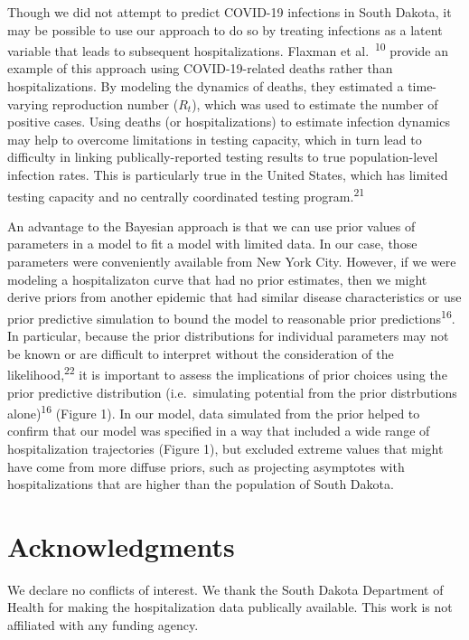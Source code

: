\documentclass[
]{article}
\begin{document}
Though we did not attempt to predict COVID-19 infections in South Dakota, it may be possible to use our approach to do so by treating infections as a latent variable that leads to subsequent hospitalizations. Flaxman et al.~\textsuperscript{10} provide an example of this approach using COVID-19-related deaths rather than hospitalizations. By modeling the dynamics of deaths, they estimated a time-varying reproduction number (\(R_t\)), which was used to estimate the number of positive cases. Using deaths (or hospitalizations) to estimate infection dynamics may help to overcome limitations in testing capacity, which in turn lead to difficulty in linking publically-reported testing results to true population-level infection rates. This is particularly true in the United States, which has limited testing capacity and no centrally coordinated testing program.\textsuperscript{21}

An advantage to the Bayesian approach is that we can use prior values of parameters in a model to fit a model with limited data. In our case, those parameters were conveniently available from New York City. However, if we were modeling a hospitalizaton curve that had no prior estimates, then we might derive priors from another epidemic that had similar disease characteristics or use prior predictive simulation to bound the model to reasonable prior predictions\textsuperscript{16}. In particular, because the prior distributions for individual parameters may not be known or are difficult to interpret without the consideration of the likelihood,\textsuperscript{22} it is important to assess the implications of prior choices using the prior predictive distribution (i.e.~simulating potential from the prior distrbutions alone)\textsuperscript{16} (Figure 1). In our model, data simulated from the prior helped to confirm that our model was specified in a way that included a wide range of hospitalization trajectories (Figure 1), but excluded extreme values that might have come from more diffuse priors, such as projecting asymptotes with hospitalizations that are higher than the population of South Dakota.

\hypertarget{acknowledgments}{%
\section{Acknowledgments}\label{acknowledgments}}

We declare no conflicts of interest. We thank the South Dakota Department of Health for making the hospitalization data publically available. This work is not affiliated with any funding agency.
\end{document}
